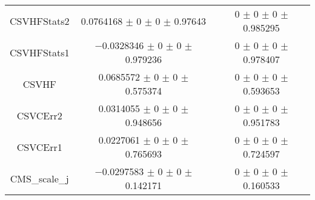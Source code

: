 \begin{table}
\begin{tabular}{ccc}
CSVHFStats2 	& \num{0.0764168} $\pm$ \num{0} $\pm$ \num{0} $\pm$ \num{0.97643} 	& \num{0} $\pm$ \num{0} $\pm$ \num{0} $\pm$ \num{0.985295}\\
CSVHFStats1 	& \num{-0.0328346} $\pm$ \num{0} $\pm$ \num{0} $\pm$ \num{0.979236} 	& \num{0} $\pm$ \num{0} $\pm$ \num{0} $\pm$ \num{0.978407}\\
CSVHF 	& \num{0.0685572} $\pm$ \num{0} $\pm$ \num{0} $\pm$ \num{0.575374} 	& \num{0} $\pm$ \num{0} $\pm$ \num{0} $\pm$ \num{0.593653}\\
CSVCErr2 	& \num{0.0314055} $\pm$ \num{0} $\pm$ \num{0} $\pm$ \num{0.948656} 	& \num{0} $\pm$ \num{0} $\pm$ \num{0} $\pm$ \num{0.951783}\\
CSVCErr1 	& \num{0.0227061} $\pm$ \num{0} $\pm$ \num{0} $\pm$ \num{0.765693} 	& \num{0} $\pm$ \num{0} $\pm$ \num{0} $\pm$ \num{0.724597}\\
CMS\_scale\_j 	& \num{-0.0297583} $\pm$ \num{0} $\pm$ \num{0} $\pm$ \num{0.142171} 	& \num{0} $\pm$ \num{0} $\pm$ \num{0} $\pm$ \num{0.160533}\\
\bottomrule
\end{tabular}
\end{table}